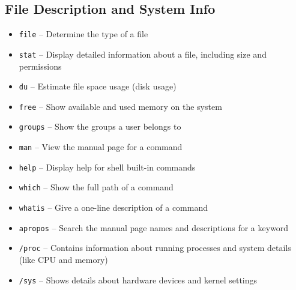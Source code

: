 \documentclass[a4paper,12pt=]{article}
\begin{document}
\subsection{File Description and System Info}
    \begin{itemize}
        \item \texttt{file} – Determine the type of a file
        \item \texttt{stat} – Display detailed information about a file, including size and permissions
        \item \texttt{du} – Estimate file space usage (disk usage)
        \item \texttt{free} – Show available and used memory on the system
        \item \texttt{groups} – Show the groups a user belongs to
    
        \item \texttt{man} – View the manual page for a command
        \item \texttt{help} – Display help for shell built-in commands
        \item \texttt{which} – Show the full path of a command
        \item \texttt{whatis} – Give a one-line description of a command
        \item \texttt{apropos} – Search the manual page names and descriptions for a keyword
        \item \texttt{/proc} – Contains information about running processes and system details (like CPU and memory)
        \item \texttt{/sys} – Shows details about hardware devices and kernel settings
    \end{itemize}
\end{document}
